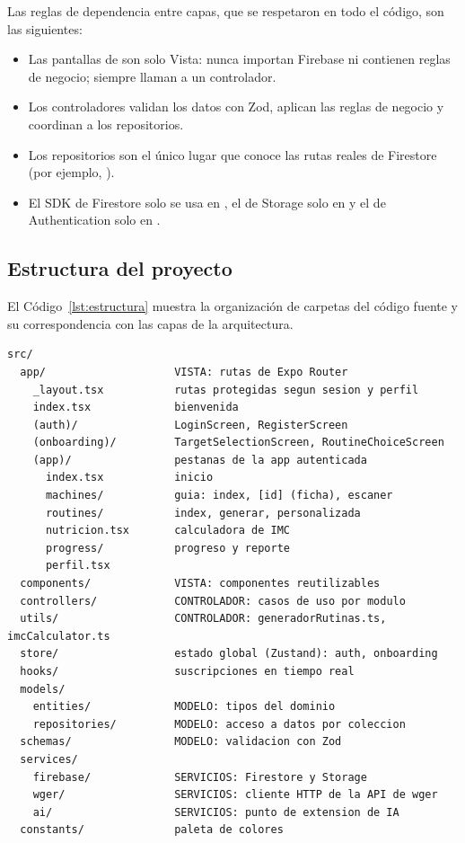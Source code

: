 Las reglas de dependencia entre capas, que se respetaron en todo el código,
son las siguientes:

\begin{itemize}
    \item Las pantallas de  son solo Vista: nunca importan
    Firebase ni contienen reglas de negocio; siempre llaman a un controlador.
    \item Los controladores validan los datos con Zod, aplican las reglas de
    negocio y coordinan a los repositorios.
    \item Los repositorios son el único lugar que conoce las rutas reales de
    Firestore (por ejemplo, ).
    \item El SDK de Firestore solo se usa en , el
    de Storage solo en  y el de Authentication solo
    en .
\end{itemize}

\subsection{Estructura del proyecto}

El Código~\ref{lst:estructura} muestra la organización de carpetas del
código fuente y su correspondencia con las capas de la arquitectura.

\begin{lstlisting}[language={}, numbers=none, caption={Estructura de carpetas del código fuente}, label={lst:estructura}]
src/
  app/                    VISTA: rutas de Expo Router
    _layout.tsx           rutas protegidas segun sesion y perfil
    index.tsx             bienvenida
    (auth)/               LoginScreen, RegisterScreen
    (onboarding)/         TargetSelectionScreen, RoutineChoiceScreen
    (app)/                pestanas de la app autenticada
      index.tsx           inicio
      machines/           guia: index, [id] (ficha), escaner
      routines/           index, generar, personalizada
      nutricion.tsx       calculadora de IMC
      progress/           progreso y reporte
      perfil.tsx
  components/             VISTA: componentes reutilizables
  controllers/            CONTROLADOR: casos de uso por modulo
  utils/                  CONTROLADOR: generadorRutinas.ts, imcCalculator.ts
  store/                  estado global (Zustand): auth, onboarding
  hooks/                  suscripciones en tiempo real
  models/
    entities/             MODELO: tipos del dominio
    repositories/         MODELO: acceso a datos por coleccion
  schemas/                MODELO: validacion con Zod
  services/
    firebase/             SERVICIOS: Firestore y Storage
    wger/                 SERVICIOS: cliente HTTP de la API de wger
    ai/                   SERVICIOS: punto de extension de IA
  constants/              paleta de colores
\end{lstlisting}

